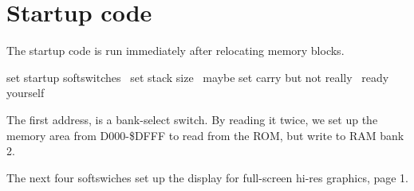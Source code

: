 \documentclass[10pt]{report}%
\begin{document}
\section{Startup code}

The startup code is run immediately after relocating memory blocks.

\nwenddocs{}\endmoddef\nwstartdeflinemarkup{}\nwenddeflinemarkup
    \LA{}set startup softswitches~{\nwtagstyle{}}\RA{}
    \LA{}set stack size~{\nwtagstyle{}}\RA{}
    \LA{}maybe set carry but not really~{\nwtagstyle{}}\RA{}
    \LA{}ready yourself~{\nwtagstyle{}}\RA{}
\nwendcode{}\nwdocspar

The first address, {\Tt{}\nwendquote} is a bank-select switch. By reading it twice, we set
up the memory area from {\Tt{}{\nwbackslash}{\$}D000-{\nwbackslash}{\$}DFFF\nwendquote} to read from the ROM, but write to RAM bank 2.

The next four softswiches set up the display for full-screen hi-res graphics, page 1.
\end{document}
